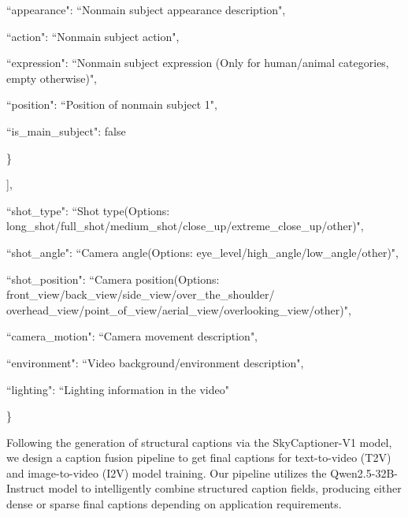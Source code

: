 \documentclass{article}
\begin{document}
\begin{tcolorbox}
\qquad \quad ``appearance": ``Non\-main subject appearance description", 
            
\qquad \quad ``action": ``Non\-main subject action",
            
\qquad \quad ``expression": ``Non\-main subject expression (Only for human/animal categories, empty otherwise)",
            
\qquad \quad ``position": ``Position of non\-main subject 1",
            
\qquad \quad ``is\_main\_subject": false
            
\qquad  \}
        
\qquad  ],
    
\qquad  ``shot\_type": ``Shot type(Options: long\_shot/full\_shot/medium\_shot/close\_up/extreme\_close\_up/other)", 
    
\qquad  ``shot\_angle": ``Camera angle(Options: eye\_level/high\_angle/low\_angle/other)",
    
\qquad  ``shot\_position": ``Camera position(Options: front\_view/back\_view/side\_view/over\_the\_shoulder/ overhead\_view/point\_of\_view/aerial\_view/overlooking\_view/other)", 
    
\qquad  ``camera\_motion": ``Camera movement description",
    
\qquad  ``environment": ``Video background/environment description",
    
\qquad  ``lighting": ``Lighting information in the video"
    
\}

\end{tcolorbox}


Following the generation of structural captions via the SkyCaptioner-V1 model, we design a caption fusion pipeline to get final captions for text-to-video (T2V) and image-to-video (I2V) model training. Our pipeline utilizes the Qwen2.5-32B-Instruct model to intelligently combine structured caption fields, producing either dense or sparse final captions depending on application requirements.
\end{document}
